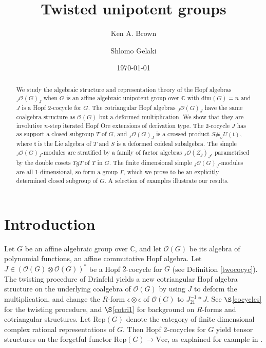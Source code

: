 \documentclass{amsart}
\numberwithin{equation}{section}
\theoremstyle{definition}
\begin{document}
\title[Twisted unipotent groups]{Twisted unipotent groups}

\author{Ken A. Brown}
\address{School of Mathematics and Statistics,
University of Gasgow,
Gasgow G12 8QQ, United Kingdom}


\author{Shlomo Gelaki}
\address{Department of Mathematics,
Iowa State University, Ames, IA 50100, USA.}


\date{\today}

\begin{abstract}
We study the algebraic structure and representation theory of the Hopf algebras ${}_J\mathcal{O}(G)_J$ when $G$ is an affine algebraic unipotent group over $\mathbb{C}$ with $\mathrm{dim}(G) = n$ and $J$ is a Hopf $2$-cocycle for $G$. The cotriangular Hopf algebras ${}_J\mathcal{O}(G)_J$ have the same coalgebra structure as $\mathcal{O}(G)$ but a deformed multiplication. We show that they are involutive $n$-step iterated Hopf Ore extensions of derivation type. The 2-cocycle $J$ has as support a closed subgroup $T$ of $G$, and ${}_J\mathcal{O}(G)_J$ is a crossed product $S \#_{\sigma}U(\mathfrak{t})$, where $\mathfrak{t}$ is the Lie algebra of $T$ and $S$ is a deformed coideal subalgebra. The simple ${}_J\mathcal{O}(G)_J$-modules are stratified by a family of factor algebras ${}_J\mathcal{O}(Z_g)_J$, parametrised by the double cosets $TgT$ of $T$ in $G$. The finite dimensional simple ${}_J\mathcal{O}(G)_J$-modules are all 1-dimensional, so form a group $\Gamma$, which we prove to be an explicitly determined closed subgroup of $G$. A selection of examples illustrate our results.
\end{abstract}

\maketitle

\tableofcontents

\section{Introduction}\label{intro} 
 
Let $G$ be an affine algebraic group over $\mathbb{C}$, and let $\mathcal{O}(G)$ be its algebra of polynomial functions, an affine commutative Hopf algebra. Let $J \in \left(\mathcal{O}(G) \otimes \mathcal{O}(G)\right)^*$ be a Hopf $2$-cocycle for $G$ (see Definition \ref{twococyc}). The twisting procedure of Drinfeld \cite{Dr2} yields a new cotriangular Hopf algebra structure on the underlying coalgebra of $\mathcal{O}(G)$ by using $J$ to deform the multiplication, and change the $R$-form $\epsilon \otimes \epsilon$ of $\mathcal{O}(G)$ to  
$J_{21}^{-1}\ast J$. See  $\S$\ref{cocycles} for the twisting procedure, and $\S$\ref{cotri1} for background on $R$-forms and cotriangular structures. Let $\mathrm{Rep}(G)$ denote the category of finite dimensional complex rational representations of $G$. Then Hopf $2$-cocycles for $G$ yield tensor structures on the forgetful functor $\mathrm{Rep}(G) \rightarrow \mathrm{Vec}$, as explained for example in \cite[Chapter 5]{EGNO}. 
\end{document}
